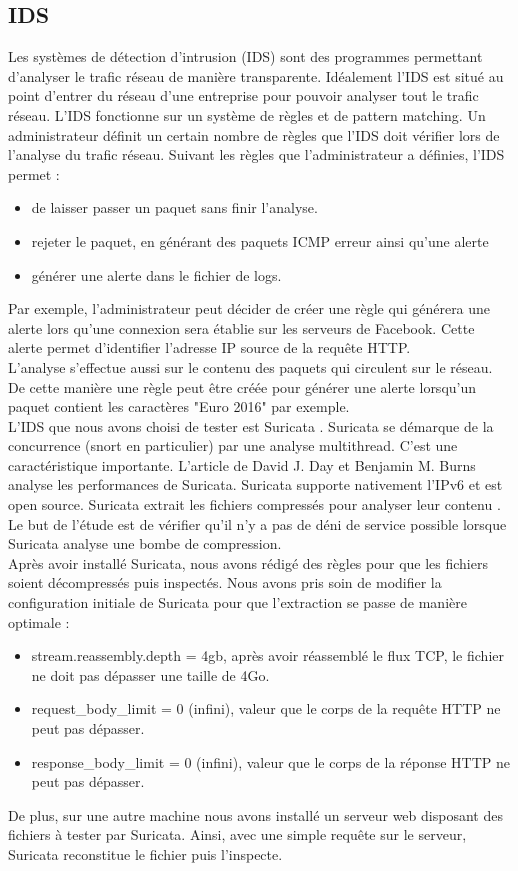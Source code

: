 \documentclass[smallextended]{svjour3}       %
\begin{document}
\subsection{IDS}
\label{2.3ids}
Les systèmes de détection d'intrusion (IDS) sont des programmes permettant d'analyser le trafic réseau de manière transparente. Idéalement l'IDS est situé au point d'entrer du réseau d'une entreprise pour pouvoir analyser tout le trafic réseau. L'IDS fonctionne sur un système de règles et de pattern matching. Un administrateur définit un certain nombre de règles que l'IDS doit vérifier lors de l'analyse du trafic réseau. Suivant les règles que l’administrateur a définies, l'IDS permet :
\begin{itemize}
\item de laisser passer un paquet sans finir l'analyse.
\item rejeter le paquet, en générant des paquets ICMP erreur ainsi qu'une alerte
\item générer une alerte dans le fichier de logs.
\end{itemize} 
Par exemple, l'administrateur peut décider de créer une règle  qui générera une alerte lors qu'une connexion sera établie sur les serveurs de Facebook. Cette alerte permet d'identifier l'adresse IP source de la requête HTTP.\\
L'analyse s'effectue aussi sur le contenu des paquets qui circulent sur le réseau. De cette manière une règle peut être créée pour générer une alerte lorsqu'un paquet contient les caractères "Euro 2016" par exemple.\\
L'IDS que nous avons choisi de tester est Suricata \cite{Suricata}. Suricata se démarque de la concurrence (snort en particulier) par une analyse multithread. C'est une caractéristique importante. L'article de David J. Day et Benjamin M. Burns \cite{PerformanceAnalysis}  analyse les performances de Suricata. Suricata supporte nativement l'IPv6 et est open source. Suricata extrait les fichiers compressés pour analyser leur contenu \cite{SuricataExtraction}. Le but de l’étude est de vérifier qu'il n'y a pas de déni de service possible lorsque Suricata analyse une bombe de compression.\\
Après avoir installé Suricata, nous avons rédigé des règles pour que les fichiers soient décompressés puis inspectés. Nous avons pris soin de modifier la configuration initiale de Suricata pour que l'extraction se passe de manière optimale :
\begin{itemize}
\item stream.reassembly.depth = 4gb, après avoir réassemblé le flux TCP, le fichier ne doit pas dépasser une taille de 4Go.
\item request\_body\_limit = 0 (infini), valeur que le corps de la requête HTTP ne peut pas dépasser.
\item response\_body\_limit = 0 (infini), valeur que le corps de la réponse HTTP ne peut pas dépasser.
\end{itemize}
De plus, sur une autre machine nous avons installé un serveur web disposant des fichiers à tester par Suricata. Ainsi, avec une simple requête sur le serveur, Suricata reconstitue le fichier puis l'inspecte.
\end{document}
